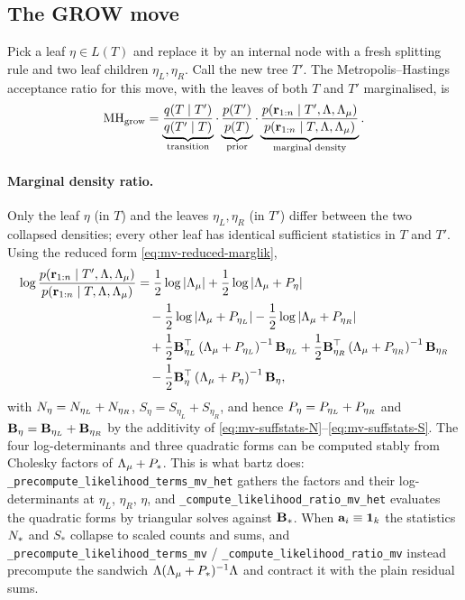 \subsection{The GROW move}
\label{sec:mv-grow}

Pick a leaf $\eta \in L(T)$ and replace it by an internal node with a fresh
splitting rule and two leaf children $\eta_L, \eta_R$. Call the new tree $T'$.
The Metropolis--Hastings acceptance ratio for this move, with the leaves of
both $T$ and $T'$ marginalised, is
\begin{equation}
	\label{eq:mv-mh}
	\mathrm{MH}_{\mathrm{grow}}
	= \underbrace{\frac{q(T \mid T')}{q(T' \mid T)}}_{\text{transition}}
	\cdot \underbrace{\frac{p(T')}{p(T)}}_{\text{prior}}
	\cdot \underbrace{\frac{p(\mathbf{r}_{1:n} \mid T', \Lambda, \Lambda_{\mu})}{p(\mathbf{r}_{1:n} \mid T, \Lambda, \Lambda_{\mu})}}_{\text{marginal density}}.
\end{equation}

\paragraph{Marginal density ratio.}
Only the leaf $\eta$ (in $T$) and the leaves $\eta_L, \eta_R$ (in $T'$)
differ between the two collapsed densities; every other leaf has identical
sufficient statistics in $T$ and $T'$. Using the reduced form
\eqref{eq:mv-reduced-marglik},
\begin{align}
	\log\frac{p(\mathbf{r}_{1:n} \mid T', \Lambda, \Lambda_{\mu})}{p(\mathbf{r}_{1:n} \mid T, \Lambda, \Lambda_{\mu})}
	 & = \frac{1}{2}\log|\Lambda_{\mu}|
	+ \frac{1}{2}\log\left|\Lambda_{\mu} + P_\eta\right|
	\notag \\
	 & \quad - \frac{1}{2}\log\left|\Lambda_{\mu} + P_{\eta_L}\right|
	- \frac{1}{2}\log\left|\Lambda_{\mu} + P_{\eta_R}\right|
	\notag \\
	 & \quad + \frac{1}{2}\mathbf{B}_{\eta_L}^\top\left(\Lambda_{\mu} + P_{\eta_L}\right)^{-1}\mathbf{B}_{\eta_L}
	+ \frac{1}{2}\mathbf{B}_{\eta_R}^\top\left(\Lambda_{\mu} + P_{\eta_R}\right)^{-1}\mathbf{B}_{\eta_R}
	\notag \\
	 & \quad - \frac{1}{2}\mathbf{B}_\eta^\top\left(\Lambda_{\mu} + P_\eta\right)^{-1}\mathbf{B}_\eta,
	\label{eq:mv-lkratio-grow}
\end{align}
with $N_\eta = N_{\eta_L} + N_{\eta_R}$, $S_\eta = S_{\eta_L} + S_{\eta_R}$,
and hence $P_\eta = P_{\eta_L} + P_{\eta_R}$ and
$\mathbf{B}_\eta = \mathbf{B}_{\eta_L} + \mathbf{B}_{\eta_R}$ by the additivity of
\eqref{eq:mv-suffstats-N}--\eqref{eq:mv-suffstats-S}. The four
log-determinants and three quadratic forms can be computed stably from
Cholesky factors of $\Lambda_{\mu} + P_*$. This is what bartz does:
\texttt{\_precompute\_likelihood\_terms\_mv\_het} gathers the factors and
their log-determinants at $\eta_L$, $\eta_R$, $\eta$, and
\texttt{\_compute\_likelihood\_ratio\_mv\_het} evaluates the quadratic forms
by triangular solves against $\mathbf{B}_*$. When $\mathbf{a}_i \equiv \mathbf{1}_k$ the
statistics $N_*$ and $S_*$ collapse to scaled counts and sums, and
\texttt{\_precompute\_likelihood\_terms\_mv} /
\texttt{\_compute\_likelihood\_ratio\_mv} instead precompute the sandwich
$\Lambda(\Lambda_{\mu} + P_*)^{-1}\Lambda$ and contract it with the plain
residual sums.

